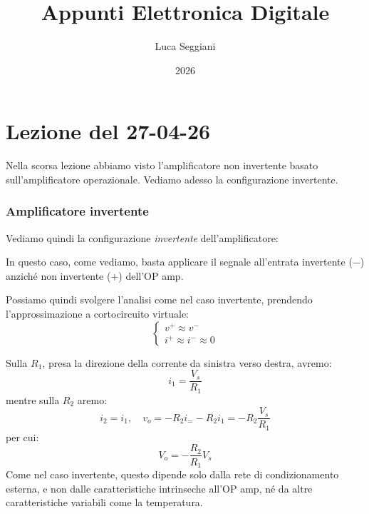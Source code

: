 \documentclass[a4paper,11pt]{article}
\title{Appunti Elettronica Digitale}
\author{Luca Seggiani}
\date{2026}
\begin{document}
\section{Lezione del 27-04-26}

\thispagestyle{empty}
\pagestyle{fancy}

Nella scorsa lezione abbiamo visto l'amplificatore non invertente basato sull'amplificatore operazionale. Vediamo adesso la configurazione invertente.

\subsubsection{Amplificatore invertente}
Vediamo quindi la configurazione \textit{invertente} dell'amplificatore:

\begin{center}
\end{center}

In questo caso, come vediamo, basta applicare il segnale all'entrata invertente ($-$) anziché non invertente ($+$) dell'OP amp.

Possiamo quindi svolgere l'analisi come nel caso invertente, prendendo l'approssimazione a cortocircuito virtuale:
$$
\begin{cases}
v^+ \approx v^- \\
i^+ \approx i^- \approx 0
\end{cases}
$$

Sulla $R_1$, presa la direzione della corrente da sinistra verso destra, avremo:
$$
i_1 = \frac{V_s}{R_1}
$$
mentre sulla $R_2$ aremo:
$$
i_2 = i_1, \quad v_o = - R_2 i _ = - R_2 i_1 = -R_2 \frac{V_s}{R_1}
$$
per cui:
$$
V_o = -\frac{R_2}{R_1} V_s
$$
Come nel caso invertente, questo dipende solo dalla rete di condizionamento esterna, e non dalle caratteristiche intrinseche all'OP amp, né da altre caratteristiche variabili come la temperatura. 
\end{document}
